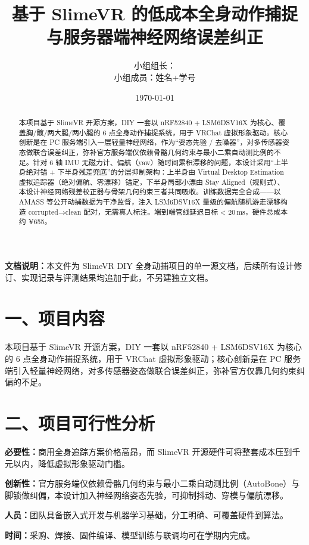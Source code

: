 \documentclass[UTF8,11pt,a4paper]{ctexart}
\title{\LARGE\bfseries 基于 SlimeVR 的低成本全身动作捕捉\\与服务器端神经网络误差纠正}
\author{%
    小组组长：\underline{\hspace{2.5cm}} \\
    小组成员：姓名+学号
}
\date{\today}
\begin{document}
\maketitle

\begin{abstract}
本项目基于 SlimeVR 开源方案，DIY 一套以 nRF52840 + LSM6DSV16X 为核心、覆盖胸/髋/两大腿/两小腿的 6 点全身动作捕捉系统，用于 VRChat 虚拟形象驱动。核心创新是在 PC 服务端引入一层轻量神经网络，作为“姿态先验 / 去噪器”，对多传感器姿态做联合误差纠正，弥补官方服务端仅依赖骨骼几何约束与最小二乘自动测比例的不足。针对 6 轴 IMU 无磁力计、偏航（yaw）随时间累积漂移的问题，本设计采用“上半身绝对锚 + 下半身残差兜底”的分层抑制架构：上半身由 Virtual Desktop Estimation 虚拟追踪器（绝对偏航、零漂移）锚定，下半身局部小漂由 Stay Aligned（规则式）、本设计神经网络残差校正器与骨架几何约束三者共同吸收。训练数据完全合成——以 AMASS 等公开动捕数据为干净监督，注入 LSM6DSV16X 量级的偏航随机游走漂移构造 corrupted→clean 配对，无需真人标注。端到端管线延迟目标 < 20\,ms，硬件总成本约 ¥655。
\end{abstract}

\noindent\textbf{文档说明：}本文件为 SlimeVR DIY 全身动捕项目的单一源文档，后续所有设计修订、实现记录与评测结果均追加于此，不另建独立文档。

\newpage
\tableofcontents
\newpage

\section{一、项目内容}
本项目基于 SlimeVR 开源方案，DIY 一套以 nRF52840 + LSM6DSV16X 为核心的 6 点全身动作捕捉系统，用于 VRChat 虚拟形象驱动；核心创新是在 PC 服务端引入轻量神经网络，对多传感器姿态做联合误差纠正，弥补官方仅靠几何约束纠偏的不足。

\section{二、项目可行性分析}
\textbf{必要性：}商用全身追踪方案价格高昂，而 SlimeVR 开源硬件可将整套成本压到千元以内，降低虚拟形象驱动门槛。

\textbf{创新性：}官方服务端仅依赖骨骼几何约束与最小二乘自动测比例（AutoBone）与脚锁做纠偏，本设计加入神经网络姿态先验，可抑制抖动、穿模与偏航漂移。

\textbf{人员：}团队具备嵌入式开发与机器学习基础，分工明确、可覆盖硬件到算法。

\textbf{时间：}采购、焊接、固件编译、模型训练与联调均可在学期内完成。
\end{document}
